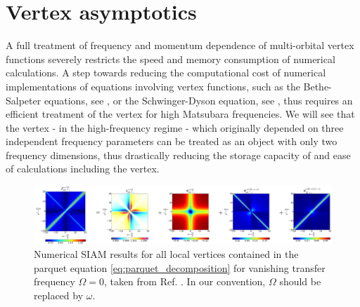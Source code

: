 \documentclass[../../main.tex]{subfiles}
\begin{document}
\section{Vertex asymptotics}

A full treatment of frequency and momentum dependence of multi-orbital vertex functions severely restricts the speed and memory consumption of numerical calculations. A step towards reducing the computational cost of numerical implementations of equations involving vertex functions, such as the Bethe-Salpeter equations, see , or the Schwinger-Dyson equation, see , thus requires an efficient treatment of the vertex for high Matsubara frequencies. We will see that the vertex - in the high-frequency regime - which originally depended on three independent frequency parameters can be treated as an object with only two frequency dimensions, thus drastically reducing the storage capacity of and ease of calculations including the vertex.
\begin{figure}[ht!]
	\centering
	\includegraphics[width=\linewidth]{../../Graphics/vertex_asymptotics_paper.png}
	\caption{Numerical SIAM results for all local vertices contained in the parquet equation \eqref{eq:parquet_decomposition} for vanishing transfer frequency $\Omega=0$, taken from Ref. \cite{high-freq asympt}. In our convention, $\Omega$ should be replaced by $\omega$.}
	\label{fig:full_vertex_siam_results_paper}
\end{figure}
\end{document}
